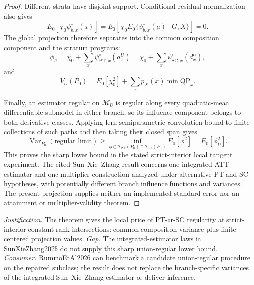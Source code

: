 \documentclass{article}
\begin{document}
\begin{proof}
Different strata have disjoint support.  Conditional-residual normalization also gives
\[
 E_0[\chi_0\psi^{\circ}_{b,x}(a)]
 =E_0\!\left[\chi_0E_0\{\psi^{\circ}_{b,x}(a)\mid G,X\}\right]=0.
 \tag{13}
\]
The global projection therefore separates into the common composition component and the stratum programs:
\[
 \phi_U=\chi_0+\sum_x\psi^{\circ}_{\mathrm{PT},x}(a_x^U)
 =\chi_0+\sum_x\psi^{\circ}_{\mathrm{SC},x}(d_x^U),
 \tag{14}
\]
and
\[
 V_U(P_0)=E_0[\chi_0^2]+\sum_xp_X(x)\min\mathrm{QP}_x.
 \tag{15}
\]

Finally, an estimator regular on \(\mathcal M_U\) is regular along every quadratic-mean differentiable submodel in either branch, so its influence component belongs to both derivative classes.  Applying \(\mathrm{lem{:}semiparametric\text{-}convolution\text{-}bound}\) to finite collections of such paths and then taking their closed span gives
\[
 \operatorname{Var}_{P_0}(\text{regular limit})
 \ge \inf_{\phi\in\mathcal I_{\mathrm{PT}}(P_0)\cap\mathcal I_{\mathrm{SC}}(P_0)}E_0[\phi^2]
 =E_0[\phi_U^2].
 \tag{16}
\]
This proves the sharp lower bound in the stated strict-interior local tangent experiment.  The cited Sun--Xie--Zhang result concerns one integrated ATT estimator and one multiplier construction analyzed under alternative PT and SC hypotheses, with potentially different branch influence functions and variances.  The present projection supplies neither an implemented standard error nor an attainment or multiplier-validity theorem.
\end{proof}
\par\smallskip\noindent \textit{Justification.} The theorem gives the local price of PT-or-SC regularity at strict-interior constant-rank intersections: common composition variance plus finite centered projection values. \textit{Gap.} The integrated-estimator laws in SunXieZhang2025 do not supply this sharp union-regular lower bound. \textit{Consumer.} RummoEtAl2026 can benchmark a candidate union-regular procedure on the repaired subclass; the result does not replace the branch-specific variances of the integrated Sun--Xie--Zhang estimator or deliver inference.
\end{document}
